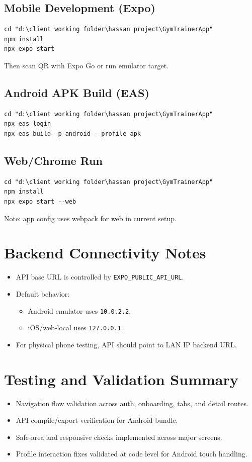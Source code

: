 \documentclass[12pt,a4paper]{article}
\begin{document}
\subsection{Mobile Development (Expo)}
\begin{verbatim}
cd "d:\client working folder\hassan project\GymTrainerApp"
npm install
npx expo start
\end{verbatim}
Then scan QR with Expo Go or run emulator target.

\subsection{Android APK Build (EAS)}
\begin{verbatim}
cd "d:\client working folder\hassan project\GymTrainerApp"
npx eas login
npx eas build -p android --profile apk
\end{verbatim}

\subsection{Web/Chrome Run}
\begin{verbatim}
cd "d:\client working folder\hassan project\GymTrainerApp"
npm install
npx expo start --web
\end{verbatim}
Note: app config uses webpack for web in current setup.

\section{Backend Connectivity Notes}
\begin{itemize}[leftmargin=1.2cm]
  \item API base URL is controlled by \texttt{EXPO\_PUBLIC\_API\_URL}.
  \item Default behavior:
  \begin{itemize}
    \item Android emulator uses \texttt{10.0.2.2},
    \item iOS/web-local uses \texttt{127.0.0.1}.
  \end{itemize}
  \item For physical phone testing, API should point to LAN IP backend URL.
\end{itemize}

\section{Testing and Validation Summary}
\begin{itemize}[leftmargin=1.2cm]
  \item Navigation flow validation across auth, onboarding, tabs, and detail routes.
  \item API compile/export verification for Android bundle.
  \item Safe-area and responsive checks implemented across major screens.
  \item Profile interaction fixes validated at code level for Android touch handling.
\end{itemize}
\end{document}
